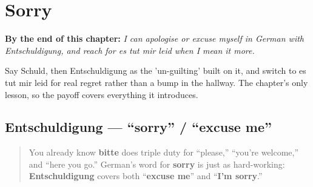
\chapter{Sorry}
\label{ch:ge-sorry}

\begin{chapteropening}
\textbf{By the end of this chapter:} \emph{I can apologise or excuse myself in German with Entschuldigung, and reach for es tut mir leid when I mean it more.}

Say Schuld, then Entschuldigung as the 'un-guilting' built on it, and switch to es tut mir leid for real regret rather than a bump in the hallway. The chapter's only lesson, so the payoff covers everything it introduces.
\end{chapteropening}

\section[Entschuldigung]{Entschuldigung — “sorry” / “excuse me”}

\label{lesson:GE-C20-entschuldigung}



\begin{quote}
You already know \textbf{bitte} does triple duty for \textquotedblleft{}please,\textquotedblright{} \textquotedblleft{}you're welcome,\textquotedblright{} and \textquotedblleft{}here you go.\textquotedblright{} German's word for \textbf{sorry} is just as hard-working: \textbf{Entschuldigung} covers both \textquotedblleft{}\textbf{excuse me}\textquotedblright{} and \textquotedblleft{}\textbf{I'm sorry}.\textquotedblright{}
\end{quote}

